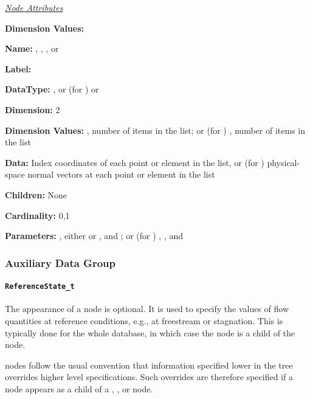 \textit{\uline{Node Attributes}}
\begin{Ventryic}{\textbf{Dimension Values:}}
\raggedright
\item [\textbf{Name:}]
      , , ,
      or 
\item [\textbf{Label:}]
\item [\textbf{DataType:}]
      , or (for )  or 
\item [\textbf{Dimension:}]
      2
\item [\textbf{Dimension Values:}]
      , number of items in the list;
      or (for ) , number
      of items in the list
\item [\textbf{Data:}]
      Index coordinates of each point or element in the list, or
      (for ) physical-space normal vectors
      at each point or element in the list
\item [\textbf{Children:}]
      None
\item [\textbf{Cardinality:}]
      0,1
\item [\textbf{Parameters:}]
      , either  or
      , and ;
      or (for )
      , , and 
\end{Ventryic}

\subsubsection{Auxiliary Data Group}

\paragraph{\texttt{ReferenceState\_t}}

The appearance of a  node is optional. It is
used to specify the values of flow quantities at reference conditions,
e.g., at freestream or stagnation. This is typically done for the whole
database, in which case the  node is a child of
the  node.

 nodes follow the usual convention that
information specified lower in the tree overrides higher level
specifications. Such overrides are therefore specified if a
 node appears as a child of a ,
, or  node.


